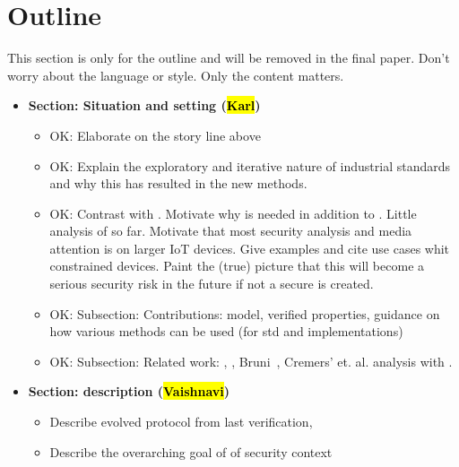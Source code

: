 \documentclass[runningheads]{llncs}
\begin{document}
{\color{blue}
\section*{Outline}
This section is only for the outline and will be removed in the final
    paper. Don't worry about the language or style. Only the content matters.
\vspace{10pt}

\begin{itemize}
    \item \textbf{Section: Situation and setting (\hl{Karl})}
        \begin{itemize}
            \item OK: Elaborate on the story line above
            \item OK: Explain the exploratory and iterative nature of industrial
                  standards and why this has resulted in the new \mStat methods.
            \item OK: Contrast with \mTls. Motivate why \mEdhoc is needed in
                addition to \mTls. Little analysis of \mEdhoc so far.
                Motivate that most security analysis and media attention is on
                larger IoT devices. Give examples and cite use cases whit
                constrained devices. Paint the (true) picture that this will
                become a serious security risk in the future if not a secure
                \mEdhoc is created.
            \item OK: Subsection: Contributions: model, verified properties,
                guidance on how various methods can be used (for std and
                implementations)
            \item OK: Subsection: Related work: \mOptls, \mNoise,
                Bruni~\cite{DBLP:conf/secsr/BruniJPS18}, Cremers' et. al. \mTls
                analysis with \mTamarin.
        \end{itemize}
    \item \textbf{Section: \mEdhoc description (\hl{Vaishnavi})}
        \begin{itemize}
            \item Describe evolved protocol from last \mEdhoc verification,
            \item Describe the overarching goal of \mEdhoc of security context

\end{itemize}
\end{itemize}}
\end{document}
